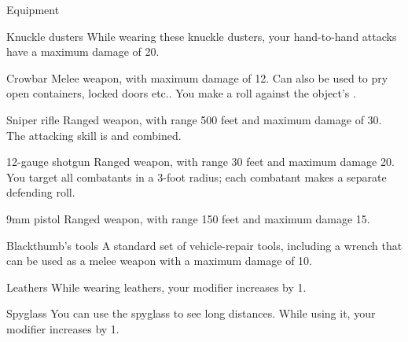 
\begin{abstractsection}{Equipment}

\begin{describe}{Knuckle dusters}
  While wearing these knuckle dusters, your hand-to-hand attacks have a maximum damage of 20.
\end{describe}

\begin{describe}{Crowbar}
  Melee weapon, with maximum damage of 12. Can also be used to pry open containers, locked doors etc.. You make a  roll against the object's .
\end{describe}

\begin{describe}{Sniper rifle}
  Ranged weapon, with range 500 feet and maximum damage of 30. The attacking skill is  and  combined.
\end{describe}

\begin{describe}{12-gauge shotgun}
  Ranged weapon, with range 30 feet and maximum damage 20. You target all combatants in a 3-foot radius; each combatant makes a separate defending roll.
\end{describe}

\begin{describe}{9mm pistol}
  Ranged weapon, with range 150 feet and maximum damage 15.
\end{describe}

\begin{describe}{Blackthumb's tools}
  A standard set of vehicle-repair tools, including a wrench that can be used as a melee weapon with a maximum damage of 10.
\end{describe}

\begin{describe}{Leathers}
  While wearing leathers, your  modifier increases by 1.
\end{describe}

\begin{describe}{Spyglass}
  You can use the spyglass to see long distances. While using it, your  modifier increases by 1.
\end{describe}


\end{abstractsection}
